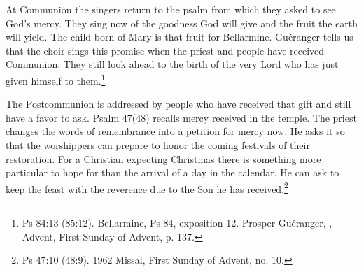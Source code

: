 At Communion the singers return to the psalm from which they asked to see God's mercy. They sing now of the goodness God will give and the fruit the earth will yield. The child born of Mary is that fruit for Bellarmine. Guéranger tells us that the choir sings this promise when the priest and people have received Communion. They still look ahead to the birth of the very Lord who has just given himself to them.\footnote{Ps 84:13 (85:12). Bellarmine, Ps 84, exposition 12. Prosper Guéranger, , Advent, First Sunday of Advent, p. 137.}

The Postcommunion is addressed by people who have received that gift and still have a favor to ask. Psalm 47(48) recalls mercy received in the temple. The priest changes the words of remembrance into a petition for mercy now. He asks it so that the worshippers can prepare to honor the coming festivals of their restoration. For a Christian expecting Christmas there is something more particular to hope for than the arrival of a day in the calendar. He can ask to keep the feast with the reverence due to the Son he has received.\footnote{Ps 47:10 (48:9). 1962 Missal, First Sunday of Advent, no. 10.}
\clearpage
